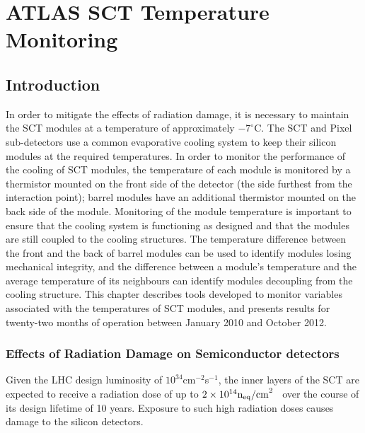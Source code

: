 \graphicspath{{Chapters/SCT/Figures/}}

\chapter{ATLAS SCT Temperature Monitoring}
\label{chap:SCT}

\section{Introduction}

In order to mitigate the effects of radiation
damage, it is necessary to maintain the SCT modules at a temperature of
approximately
$-7^{\circ}$C. The SCT and Pixel
sub-detectors use a common evaporative cooling system to keep their silicon
modules at the required temperatures. In order to monitor the
performance of the cooling of SCT modules, the temperature of
each module is monitored by a thermistor mounted on the front side of the
detector (the side furthest from the interaction point); barrel modules have
an additional thermistor mounted on the back side of the module. Monitoring of
the module temperature is important to ensure that the cooling system is
functioning as designed and that the modules are still coupled to the cooling
structures. The temperature difference between the front and the back of barrel
modules can be used to identify modules losing mechanical integrity, and the
difference between a module's temperature and the average temperature of its
neighbours can identify modules decoupling from the cooling structure. 
This chapter describes tools developed to monitor variables associated with the temperatures of
SCT modules, and presents results for twenty-two months of operation between
January 2010 and October 2012.



\subsection{Effects of Radiation Damage on Semiconductor detectors}
Given the LHC design luminosity of $10^{34}$cm$^{-2}$s$^{-1}$, the
inner layers of the 
SCT are expected to receive a radiation dose of up to
$2\times10^{14}\rm{n_{eq}/cm}^2$~\cite{Ahmad200798} over the course of its design
lifetime of 10 years.
Exposure to such high radiation doses causes damage to the silicon detectors. 

